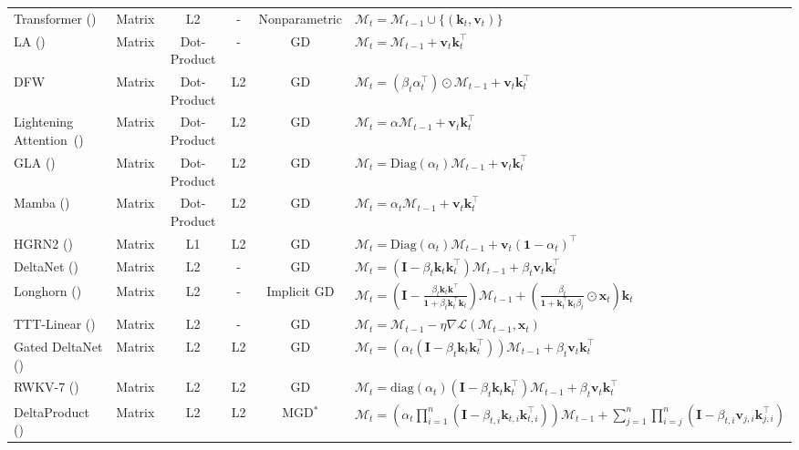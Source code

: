 \documentclass{article}
\newcommand{\vk}[0]{\mathbf{k}}
\newcommand{\vvv}[0]{\mathbf{v}}
\newcommand{\mb}[1]{\mathbf{#1}}
\newcommand{\M}[0]{\mathcal{M}}
\theoremstyle{plain}
\theoremstyle{definition}
\theoremstyle{remark}
\begin{document}
\begin{table}[t!]
{\begin{tabular}{l c c c c c c}
         \midrule
         Transformer (\citeyear{Vaswani+2017}) & Matrix & L2 & - & Nonparametric & \multicolumn{2}{l}{$\M_t = \M_{t-1} \cup \{(\vk_t, \vvv_t)\}$} \\
         LA (\citeyear{schlag2021linear})          & Matrix         & Dot-Product & - &  GD & \multicolumn{2}{l}{$\M_t = \M_{t-1} + \vvv_t \vk_t^{\top}$}\\
         DFW          & Matrix         & Dot-Product & L2 &  GD & \multicolumn{2}{l}{$\M_t = \left(\beta_t \alpha_t^{\top} \right) \odot \M_{t-1} + \vvv_t \vk_t^{\top}$}\\
         Lightening Attention~(\citeyear{li2025minimax})       & Matrix     & Dot-Product & L2 &  GD & \multicolumn{2}{l}{$\M_t = \alpha   \M_{t-1}   +  \vvv_t\vk_t^\top$}\\
         GLA (\citeyear{yang2024gatedattn})        & Matrix     & Dot-Product & L2 &  GD & \multicolumn{2}{l}{$\M_t = \text{Diag}(\alpha_t )  \M_{t-1}   +  \vvv_t\vk_t^\top$}\\
         Mamba (\citeyear{gu2024mamba})     & Matrix         & Dot-Product & L2 &  GD & \multicolumn{2}{l}{$\M_t =   \alpha_t \M_{t-1} + \vvv_t \vk_t^\top $}\\
         HGRN2 (\citeyear{qin2024hgrn})      & Matrix  & L1 & L2 &  GD & \multicolumn{2}{l}{$\M_t =   \text{Diag}( \alpha_t) \M_{t-1}  +  \vvv_t(\mathbf{1} - \alpha_t)^\top $}\\
         DeltaNet (\citeyear{neil2017delta}) & Matrix         & L2 & - &  GD & \multicolumn{2}{l}{$\M_t =   (\mathbf{I} - \beta_t \vk_t \vk_t^\top) \M_{t-1} + \beta_t \vvv_t  \vk_t^\top$}\\
         Longhorn (\citeyear{liu2024longhorn})  & Matrix         & L2 & - &  Implicit GD & \multicolumn{2}{l}{$\M_t =  \left(\mathbf{I}- \frac{\beta_t \vk_t \vk^\top}{\mathbf{1}+ \beta_t \vk_t^\top \vk_t} \right) \M_{t-1} + \left(\frac{\beta_t}{\mathbf{1}+ \vk_t^\top \vk_t \beta_t } \odot \mathbf{x}_t\right) \vk_t$}\\
         TTT-Linear (\citeyear{sun2024learning}) & Matrix         & L2 & - &  GD & \multicolumn{2}{l}{$\M_t = \M_{t-1} - \eta\nabla \mathcal{L}(\M_{t-1}, \mb{x}_t)$}\\

         Gated DeltaNet (\citeyear{yang2024gated}) & Matrix & L2 & L2 & GD & \multicolumn{2}{l}{$\M_t =   \left(\alpha_t (\mathbf{I} - \beta_t \vk_t \vk_t^\top)\right) \M_{t-1} + \beta_t \vvv_t  \vk_t^\top$} \\
         RWKV-7 (\citeyear{peng2025rwkv7}) & Matrix & L2 & L2 & GD & \multicolumn{2}{l}{$\M_t = \text{diag}(\alpha_t)\left( \mathbf{I} - \beta_t \vk_t \vk_t^\top \right) \M_{t-1} + \beta_t \vvv_t  \vk_t^\top$}\\
         DeltaProduct (\citeyear{siems2025deltaproduct}) & Matrix & L2 & L2 & MGD$^*$ & \multicolumn{2}{l}{$\M_t =   \left(\alpha_t \prod_{i = 1}^{n} (\mathbf{I} - \beta_{t, i} \vk_{t, i} \vk_{t, i}^\top)\right) \M_{t-1} + \sum_{j = 1}^{n} \prod_{i = j}^{n} (\mathbf{I} - \beta_{t, i} \vvv_{j, i} \vk_{j, i}^\top)$}\\


\end{tabular}}
\end{table}
\end{document}
